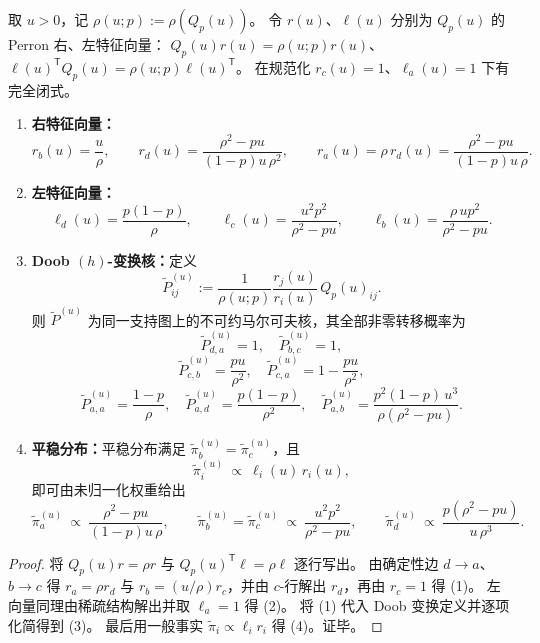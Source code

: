 \begin{theorem}\label{thm:fold-bernoulli-p-doob-transform-closed}
取 \(u>0\)，记 \(\rho(u;p):=\rho(Q_p(u))\)。
令 \(r(u)\)、\(\ell(u)\) 分别为 \(Q_p(u)\) 的 Perron 右、左特征向量：
\(
Q_p(u)r(u)=\rho(u;p)r(u)
\)、
\(
\ell(u)^{\mathsf T}Q_p(u)=\rho(u;p)\ell(u)^{\mathsf T}
\)。
在规范化 \(r_c(u)=1\)、\(\ell_a(u)=1\) 下有完全闭式。
\begin{enumerate}
  \item \textbf{右特征向量：}
  \[
  r_b(u)=\frac{u}{\rho},\qquad
  r_d(u)=\frac{\rho^2-pu}{(1-p)u\,\rho^2},\qquad
  r_a(u)=\rho\,r_d(u)=\frac{\rho^2-pu}{(1-p)u\,\rho}.
  \]
  \item \textbf{左特征向量：}
  \[
  \ell_d(u)=\frac{p(1-p)}{\rho},\qquad
  \ell_c(u)=\frac{u^2p^2}{\rho^2-pu},\qquad
  \ell_b(u)=\frac{\rho\,u p^2}{\rho^2-pu}.
  \]
  \item \textbf{Doob \texorpdfstring{$(h)$}{(h)}-变换核：}定义
  \[
  \widetilde P^{(u)}_{ij}:=\frac{1}{\rho(u;p)}\frac{r_j(u)}{r_i(u)}\,Q_p(u)_{ij}.
  \]
  则 \(\widetilde P^{(u)}\) 为同一支持图上的不可约马尔可夫核，其全部非零转移概率为
  \[
  \widetilde P^{(u)}_{d,a}=1,\quad \widetilde P^{(u)}_{b,c}=1,
  \]
  \[
  \widetilde P^{(u)}_{c,b}=\frac{pu}{\rho^2},\quad
  \widetilde P^{(u)}_{c,a}=1-\frac{pu}{\rho^2},
  \]
  \[
  \widetilde P^{(u)}_{a,a}=\frac{1-p}{\rho},\quad
  \widetilde P^{(u)}_{a,d}=\frac{p(1-p)}{\rho^2},\quad
  \widetilde P^{(u)}_{a,b}=\frac{p^2(1-p)\,u^3}{\rho(\rho^2-pu)}.
  \]
  \item \textbf{平稳分布：}平稳分布满足 \(\widetilde\pi^{(u)}_b=\widetilde\pi^{(u)}_c\)，且
  \[
  \widetilde\pi^{(u)}_i\ \propto\ \ell_i(u)\,r_i(u),
  \]
  即可由未归一化权重给出
  \[
  \widetilde\pi^{(u)}_a\ \propto\ \frac{\rho^2-pu}{(1-p)u\,\rho},\qquad
  \widetilde\pi^{(u)}_b=\widetilde\pi^{(u)}_c\ \propto\ \frac{u^2p^2}{\rho^2-pu},\qquad
  \widetilde\pi^{(u)}_d\ \propto\ \frac{p(\rho^2-pu)}{u\,\rho^3}.
  \]
\end{enumerate}
\end{theorem}
\begin{proof}
将 \(Q_p(u)r=\rho r\) 与 \(Q_p(u)^{\mathsf T}\ell=\rho\ell\) 逐行写出。
由确定性边 \(d\to a\)、\(b\to c\) 得
\(
r_a=\rho r_d
\) 与
\(
r_b=(u/\rho)r_c
\)，并由 \(c\)-行解出 \(r_d\)，再由 \(r_c=1\) 得 (1)。
左向量同理由稀疏结构解出并取 \(\ell_a=1\) 得 (2)。
将 (1) 代入 Doob 变换定义并逐项化简得到 (3)。
最后用一般事实 \(\widetilde\pi_i\propto \ell_i r_i\) 得 (4)。证毕。
\end{proof}

